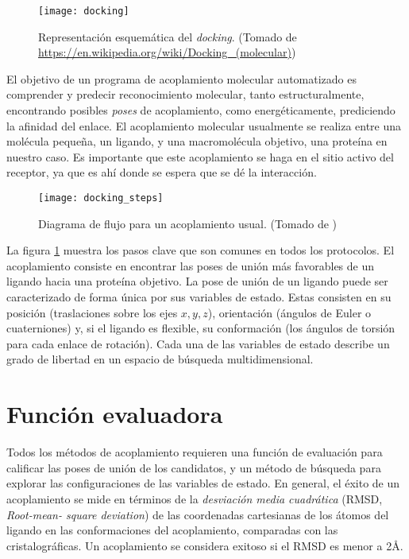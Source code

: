 \begin{figure}[H]
  \texttt{[image: docking]} \centering
  \caption{Representación esquemática del \textit{docking}.  (Tomado de
    \url{https://en.wikipedia.org/wiki/Docking_(molecular)})}
\end{figure}

El objetivo de un programa de acoplamiento molecular automatizado es
comprender y predecir reconocimiento molecular, tanto
estructuralmente, encontrando posibles \textit{poses} de acoplamiento,
como energéticamente, prediciendo la afinidad del enlace. El
acoplamiento molecular usualmente se realiza entre una molécula
pequeña, un ligando, y una macromolécula objetivo, una proteína en
nuestro caso. Es importante que este acoplamiento se haga en el sitio
activo del receptor, ya que es ahí donde se espera que se dé la
interacción.

\begin{figure}[H]
  \texttt{[image: docking\_steps]}
  \caption{Diagrama de flujo para un acoplamiento usual.  (Tomado de
    \cite{kukol})}
  \label{fig:docking_flowchart}
\end{figure}

La figura \ref{fig:docking_flowchart} muestra los pasos clave que son
comunes en todos los protocolos. El acoplamiento consiste en encontrar
las poses de unión más favorables de un ligando hacia una proteína
objetivo. La pose de unión de un ligando puede ser caracterizado de
forma única por sus variables de estado. Estas consisten en su
posición (traslaciones sobre los ejes $x, y, z$), orientación (ángulos
de Euler o cuaterniones) y, si el ligando es flexible, su conformación
(los ángulos de torsión para cada enlace de rotación). Cada una de las
variables de estado describe un grado de libertad en un espacio de
búsqueda multidimensional.

\section{Función evaluadora}
Todos los métodos de acoplamiento requieren una función de evaluación
para calificar las poses de unión de los candidatos, y un método de
búsqueda para explorar las configuraciones de las variables de
estado. En general, el éxito de un acoplamiento se mide en términos de
la \textit{desviación media cuadrática} (RMSD, \textit{Root-mean-
square deviation}) de las coordenadas cartesianas de los átomos del
ligando en las conformaciones del acoplamiento, comparadas con las
cristalográficas. Un acoplamiento se considera exitoso si el RMSD es
menor a 2\AA.

